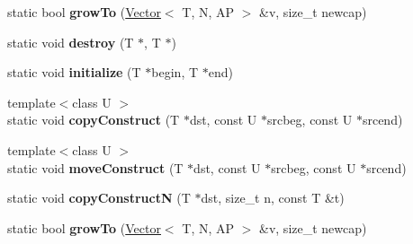 \begin{DoxyCompactItemize}
\item 
\hypertarget{structjs_1_1_vector_impl_3_01_t_00_01_n_00_01_a_p_00_01true_01_4_a9f54268da5b1da17bfb42a2db08ced5a}{static bool {\bfseries grow\-To} (\hyperlink{classjs_1_1_vector}{Vector}$<$ T, N, A\-P $>$ \&v, size\-\_\-t newcap)}\label{structjs_1_1_vector_impl_3_01_t_00_01_n_00_01_a_p_00_01true_01_4_a9f54268da5b1da17bfb42a2db08ced5a}

\item 
\hypertarget{structjs_1_1_vector_impl_3_01_t_00_01_n_00_01_a_p_00_01true_01_4_a577c31b6f9adbd398ef9756cd1945482}{static void {\bfseries destroy} (T $\ast$, T $\ast$)}\label{structjs_1_1_vector_impl_3_01_t_00_01_n_00_01_a_p_00_01true_01_4_a577c31b6f9adbd398ef9756cd1945482}

\item 
\hypertarget{structjs_1_1_vector_impl_3_01_t_00_01_n_00_01_a_p_00_01true_01_4_af8c4b379a68282deb09405e1a3fcbe27}{static void {\bfseries initialize} (T $\ast$begin, T $\ast$end)}\label{structjs_1_1_vector_impl_3_01_t_00_01_n_00_01_a_p_00_01true_01_4_af8c4b379a68282deb09405e1a3fcbe27}

\item 
\hypertarget{structjs_1_1_vector_impl_3_01_t_00_01_n_00_01_a_p_00_01true_01_4_a380614a3aaa1e3cb23a2c6343d90dcc5}{{\footnotesize template$<$class U $>$ }\\static void {\bfseries copy\-Construct} (T $\ast$dst, const U $\ast$srcbeg, const U $\ast$srcend)}\label{structjs_1_1_vector_impl_3_01_t_00_01_n_00_01_a_p_00_01true_01_4_a380614a3aaa1e3cb23a2c6343d90dcc5}

\item 
\hypertarget{structjs_1_1_vector_impl_3_01_t_00_01_n_00_01_a_p_00_01true_01_4_a13d72042407d1e1bbbc80bb20aadd0ab}{{\footnotesize template$<$class U $>$ }\\static void {\bfseries move\-Construct} (T $\ast$dst, const U $\ast$srcbeg, const U $\ast$srcend)}\label{structjs_1_1_vector_impl_3_01_t_00_01_n_00_01_a_p_00_01true_01_4_a13d72042407d1e1bbbc80bb20aadd0ab}

\item 
\hypertarget{structjs_1_1_vector_impl_3_01_t_00_01_n_00_01_a_p_00_01true_01_4_a1e9cbf9e686058634877baaaaea68762}{static void {\bfseries copy\-Construct\-N} (T $\ast$dst, size\-\_\-t n, const T \&t)}\label{structjs_1_1_vector_impl_3_01_t_00_01_n_00_01_a_p_00_01true_01_4_a1e9cbf9e686058634877baaaaea68762}

\item 
\hypertarget{structjs_1_1_vector_impl_3_01_t_00_01_n_00_01_a_p_00_01true_01_4_a9f54268da5b1da17bfb42a2db08ced5a}{static bool {\bfseries grow\-To} (\hyperlink{classjs_1_1_vector}{Vector}$<$ T, N, A\-P $>$ \&v, size\-\_\-t newcap)}\label{structjs_1_1_vector_impl_3_01_t_00_01_n_00_01_a_p_00_01true_01_4_a9f54268da5b1da17bfb42a2db08ced5a}

\end{DoxyCompactItemize}

